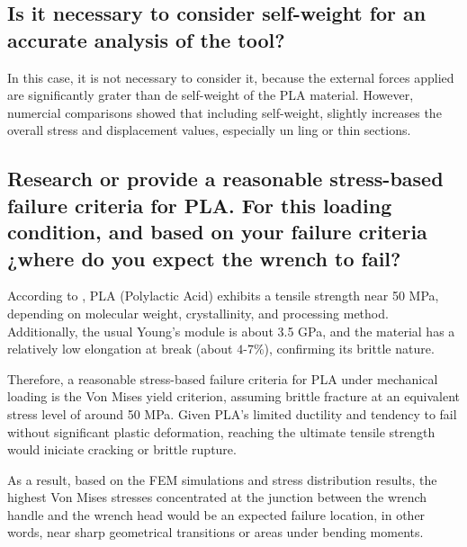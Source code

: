 \subsection{Is it necessary to consider self-weight for an accurate analysis of the tool?}

In this case, it is not necessary to consider it, because the external forces applied are significantly grater than de self-weight of the PLA material. 
However, numercial comparisons showed that including self-weight, slightly increases the overall stress and displacement values, especially un ling or thin sections.

\subsection{Research or provide a reasonable stress-based failure criteria for PLA. For this loading condition, and based on
your failure criteria ¿where do you expect the wrench to fail?}

According to \citet{farah2016}, PLA (Polylactic Acid) exhibits a tensile strength near 50 MPa, depending on molecular weight, crystallinity, and processing method. Additionally, the usual Young's module is about 3.5 GPa, and the material has a relatively low elongation at break (about $4\text{-}7\%$), confirming its brittle nature.

Therefore, a reasonable stress-based failure criteria for PLA under mechanical loading is the Von Mises yield criterion, assuming brittle fracture at an equivalent stress level of around 50 MPa. Given PLA's limited ductility and tendency to fail without significant plastic deformation, reaching the ultimate tensile strength would iniciate cracking or brittle rupture.

As a result, based on the FEM simulations and stress distribution results, the highest Von Mises stresses concentrated at the junction between the wrench handle and the wrench head would be an expected failure location, in other words, near sharp geometrical transitions or areas under bending moments.











